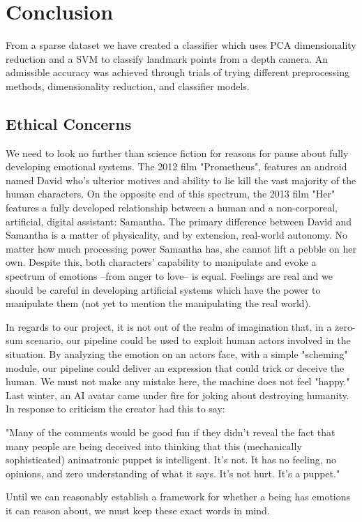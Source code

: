 \section{Conclusion}

From a sparse dataset we have created a classifier which uses PCA dimensionality reduction and a SVM to classify landmark points from a depth camera. An admissible accuracy was achieved through trials of trying different preprocessing methods, dimensionality reduction, and classifier models.

\subsection{Ethical Concerns}
We need to look no further than science fiction for reasons for pause about fully developing emotional systems. The 2012 film "Prometheus", features an android named David who's ulterior motives and ability to lie kill the vast majority of the human characters. On the opposite end of this spectrum, the 2013 film "Her" features a fully developed relationship between a human and a non-corporeal, artificial, digital assistant: Samantha. The primary difference between David and Samantha is a matter of physicality, and by extension, real-world autonomy. No matter how much processing power Samantha has, she cannot lift a pebble on her own. Despite this, both characters' capability to manipulate and evoke a spectrum of emotions --from anger to love-- is equal. Feelings are real and we should be careful in developing artificial systems which have the power to manipulate them (not yet to mention the manipulating the real world).

In regards to our project, it is not out of the realm of imagination that, in a zero-sum scenario, our pipeline could be used to exploit human actors involved in the situation. By analyzing the emotion on an actors face, with a simple "scheming" module, our pipeline could deliver an expression that could trick or deceive the human. We must not make any mistake here, the machine does not feel "happy." Last winter, an AI avatar came under fire for joking about destroying humanity. In response to criticism the creator had this to say:

"Many of the comments would be good fun if they didn’t reveal the fact that many people are being deceived into thinking that this (mechanically sophisticated) animatronic puppet is intelligent. It’s not. It has no feeling, no opinions, and zero understanding of what it says. It’s not hurt. It’s a puppet." \cite{sofia}

Until we can reasonably establish a framework for whether a being has emotions it can reason about, we must keep these exact words in mind.